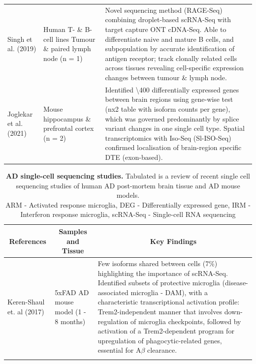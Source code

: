 \begin{landscape}
\begin{longtable}[c]{p{4cm}p{4cm}p{18cm}}
		\centering Singh et al. (2019) \cite{Singh2019} &
		\centering Human T- \& B-cell lines \newline Tumour \& paired lymph node (n = 1)  &
		\tabitem Novel sequencing method (RAGE-Seq) combining droplet-based scRNA-Seq with target capture ONT cDNA-Seq.\newline 
		\tabitem Able to differentiate naive and mature B cells, and subpopulation by accurate identification of antigen receptor; track clonally related cells across tissues revealing cell-specific expression changes between tumour \& lymph node. \\
		\hdashline[0.5pt/5pt]
		
		\centering Joglekar et al. (2021) \cite{Joglekar2021} &
		\centering Mouse hippocampus \& prefrontal cortex (n = 2) &
		\tabitem Identified \textbackslash400 differentially expressed genes between brain regions using gene-wise test (nx2 table with isoform counts per gene), which was governed predominantly by splice variant changes in one single cell type. \newline 
		\tabitem Spatial transcriptomics with Iso-Seq (Sl-ISO-Seq) confirmed localisation of brain-region specific DTE (exon-based). 
		\\* \bottomrule
	\end{longtable}
	
	\clearpage
	\begin{longtable}[c]{p{4cm}p{4cm}p{18cm}}
		\caption[AD single-cell sequencing studies]%
		{\textbf{AD single-cell sequencing studies.} Tabulated is a review of recent single cell sequencing studies of human AD post-mortem brain tissue and AD mouse models. \newline ARM - Activated response microglia, DEG - Differentially expressed gene, IRM - Interferon response microglia, scRNA-Seq - Single-cell RNA sequencing}
		\label{tab: longread_AD_advancedstudies}\\
		
		\toprule
		\multicolumn{1}{c}{References} &
		\multicolumn{1}{c}{Samples and Tissue} &
		\multicolumn{1}{c}{Key Findings} \\* \midrule
		\endfirsthead
		\endhead
		\bottomrule
		\endfoot
		\endlastfoot
		\centering Keren-Shaul et. al (2017)\cite{Keren-Shaul2017} &
		\centering 5xFAD AD mouse model (1 - 8 months) &
		\tabitem Few isoforms shared between cells (7\%) highlighting the importance of scRNA-Seq. \newline
		\tabitem Identified subsets of protective microglia (disease-associated microglia - DAM), with a characteristic transcriptional activation profile: Trem2-independent manner that involves down-regulation of microglia checkpoints, followed by activation of a Trem2-dependent program for upregulation of phagocytic-related genes, essential for A$\beta$ clearance.  \\
		\hdashline[0.5pt/5pt]	
		

\end{longtable}
\end{landscape}
